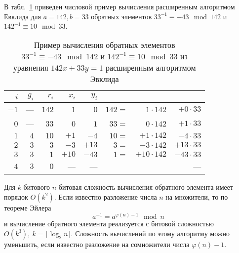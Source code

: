 \example
В табл.~\ref{tab:extended-euclid-inverse} приведен числовой пример вычисления расширенным алгоритмом Евклида для $a=142, b=33$ обратных элементов $33^{-1} \equiv -43 \mod 142$ и $142^{-1} \equiv 10 \mod 33$.

\begin{table}[!ht]
    \centering
    \caption{Пример вычисления обратных элементов $33^{-1} \equiv -43 \mod 142$ и $142^{-1} \equiv 10 \mod 33$ из уравнения $142 x + 33 y = 1$ расширенным алгоритмом Эвклида\label{tab:extended-euclid-inverse}}
    \begin{tabular}{|r|r|r|r|r|rrr|}
        \hline
        $i$ & $g_i$ & $r_i$ & $x_i$ & $y_i$ & & & \\
        \hline
        $-1$ &  --- & $142$ &   $1$ &   $0$ & $142 =$ & $  1 \cdot 142$ & $ + 0 \cdot 33$ \\
	 $0$ &  --- &  $33$ &   $0$ &   $1$ &  $33 =$ & $  0 \cdot 142$ & $ + 1 \cdot 33$ \\
	 $1$ &  $4$ &  $10$ &  $+1$ &  $-4$ &  $10 =$ & $ +1 \cdot 142$ & $ - 4 \cdot 33$ \\
	 $2$ &  $3$ &   $3$ &  $-3$ & $+13$ &   $3 =$ & $ -3 \cdot 142$ & $+ 13 \cdot 33$ \\
	 $3$ &  $3$ &   $1$ & $+10$ & $-43$ &   $1 =$ & $+10 \cdot 142$ & $- 43 \cdot 33$ \\
	 $4$ &  $3$ &   $0$ &   --- &   --- & & & --- \\
        \hline
    \end{tabular}
\end{table}
\exampleend

Для $k$-битового $n$ битовая сложность вычисления обратного элемента имеет порядок $O(k^2)$. Если известно разложение числа $n$ на множители, то по теореме Эйлера
    \[ a^{-1} = a^{\varphi(n) - 1} \mod n \]
и вычисление обратного элемента реализуется с битовой сложностью $O(k^3),~ k = \lceil \log_2 n \rceil$. Сложность вычислений по этому алгоритму можно уменьшить, если известно разложение на сомножители числа $\varphi(n) - 1$.
